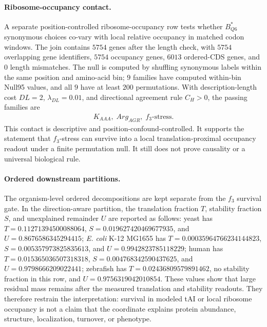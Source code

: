\paragraph{Ribosome-occupancy contact.}
A separate position-controlled ribosome-occupancy row tests whether $B^\ast_{Q6}$ synonymous choices co-vary with local relative occupancy in matched codon windows.  The join contains $5754$ genes after the length check, with $5754$ overlapping gene identifiers, $5754$ occupancy genes, $6013$ ordered-CDS genes, and $0$ length mismatches.  The null is computed by shuffling synonymous labels within the same position and amino-acid bin; $9$ families have computed within-bin Null95 values, and all $9$ have at least $200$ permutations.  With description-length cost $DL=2$, $\lambda_{DL}=0.01$, and directional agreement rule $C_H>0$, the passing families are
$$
\begin{aligned}
K_{AAA},\; Arg_{AGR},\; f_3\text{-stress}.
\end{aligned}
$$
This contact is descriptive and position-confound-controlled.  It supports the statement that $f_3$-stress can survive into a local translation-proximal occupancy readout under a finite permutation null.  It still does not prove causality or a universal biological rule.

\paragraph{Ordered downstream partitions.}
The organism-level ordered decompositions are kept separate from the $f_3$ survival gate.  In the direction-aware partition, the translation fraction $T$, stability fraction $S$, and unexplained remainder $U$ are reported as follows: yeast has $T=0.11271394500088064$, $S=0.019627420469677935$, and $U=0.8676586345294415$; \emph{E. coli} K-12 MG1655 has $T=0.00035964766234144823$, $S=0.005357973825835613$, and $U=0.9942823785118229$; human has $T=0.015365036507318318$, $S=0.004768342590437625$, and $U=0.9798666209022441$; zebrafish has $T=0.02436809579891462$, no stability fraction in this row, and $U=0.9756319042010854$.  These values show that large residual mass remains after the measured translation and stability readouts.  They therefore restrain the interpretation: survival in modeled tAI or local ribosome occupancy is not a claim that the coordinate explains protein abundance, structure, localization, turnover, or phenotype.

